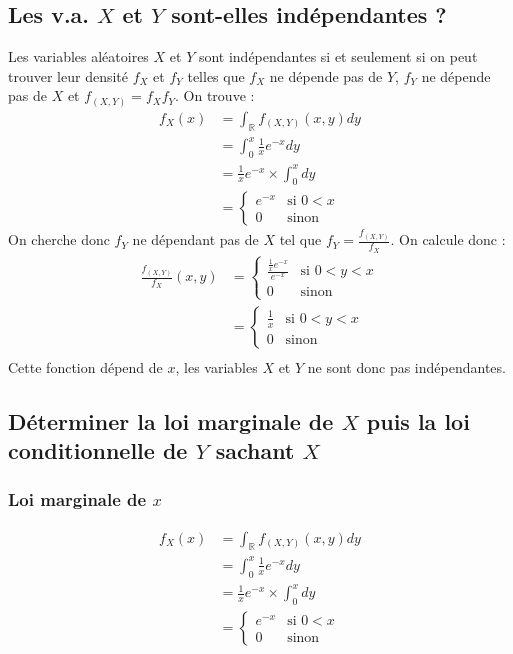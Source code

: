 \documentclass[10pt,a4paper,twoside]{article}
\begin{document}
\subsection{Les v.a. $X$ et $Y$ sont-elles indépendantes ?}
Les variables aléatoires $X$ et $Y$ sont indépendantes si et seulement si on peut trouver leur densité $f_{X}$ et $f_{Y}$ telles que $f_{X}$ ne dépende pas de $Y$, $f_{Y}$ ne dépende pas de $X$ et $f_{(X,Y)}=f_{X}f_{Y}$. On trouve :
\begin{align*}
f_{X}(x) &= \int_{\mathbb{R}}f_{(X,Y)}(x,y) dy \\
&= \int_{0}^{x} \frac{1}{x}e^{-x} dy\\
&= \frac{1}{x}e^{-x} \times \int_{0}^{x}dy\\
&= \left\lbrace \begin{array}{ll}
e^{-x} & \text{si }0<x\\
0 & \text{sinon}
\end{array}\right.
\end{align*}
On cherche donc $f_{Y}$ ne dépendant pas de $X$ tel que $f_{Y}=\frac{f_{(X,Y)}}{f_{X}}$. On calcule donc :
\begin{align*}
\frac{f_{(X,Y)}}{f_{X}}(x,y) &= \left\lbrace \begin{array}{ll}
\frac{\frac{1}{x}e^{-x}}{e^{-x}} & \text{si }0<y<x\\
0 & \text{sinon}
\end{array}\right.\\
&= \left\lbrace \begin{array}{ll}
\frac{1}{x} & \text{si }0<y<x\\
0 & \text{sinon}
\end{array}\right.\\
\end{align*}
Cette fonction dépend de $x$, les variables $X$ et $Y$ ne sont donc pas indépendantes.

\subsection{Déterminer la loi marginale de $X$ puis la loi conditionnelle de $Y$ sachant $X$}
\subsubsection{Loi marginale de $x$}
\begin{align*}
f_{X}(x) &= \int_{\mathbb{R}}f_{(X,Y)}(x,y) dy \\
&= \int_{0}^{x} \frac{1}{x}e^{-x} dy\\
&= \frac{1}{x}e^{-x} \times \int_{0}^{x}dy\\
&= \left\lbrace \begin{array}{ll}
e^{-x} & \text{si }0<x\\
0 & \text{sinon}
\end{array}\right.
\end{align*}
\end{document}
